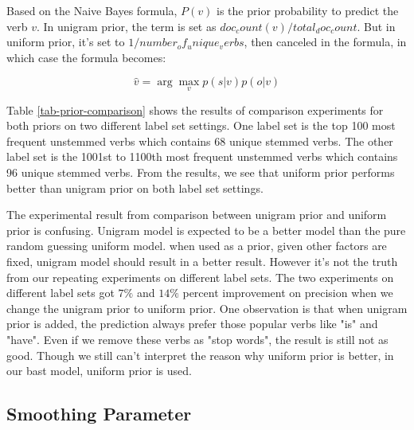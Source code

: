 Based on the Naive Bayes formula, $P(v)$ is the prior probability to predict the verb $v$. In unigram prior, the term is set as $doc_count(v) / total_doc_count$. But in uniform prior, it's set to $1/number_of_unique_verbs$, then canceled in the formula, in which case the formula becomes:

\begin{equation}
	\hat{v} = \arg\max_v p(s|v)p(o|v)
\end{equation}

Table \ref{tab-prior-comparison} shows the results of comparison experiments for both priors on two different label set settings. One label set is the top 100 most frequent unstemmed verbs which contains 68 unique stemmed verbs. The other label set is the 1001st to 1100th most frequent unstemmed verbs which contains 96 unique stemmed verbs. From the results, we see that uniform prior performs better than unigram prior on both label set settings. 

The experimental result from comparison between unigram prior and uniform prior is confusing. Unigram model is expected to be a better model than the pure random guessing uniform model. when used as a prior, given other factors are fixed, unigram model should result in a better result. However it's not the truth from our repeating experiments on different label sets. The two experiments on different label sets got $7\%$ and $14\%$ percent improvement on precision when we change the unigram prior to uniform prior. One observation is that when unigram prior is added, the prediction always prefer those popular verbs like "is" and "have". Even if we remove these verbs as "stop words", the result is still not as good. Though we still can't interpret the reason why uniform prior is better, in our bast model, uniform prior is used. \cite{peng2004augmenting}

\subsection{Smoothing Parameter}

